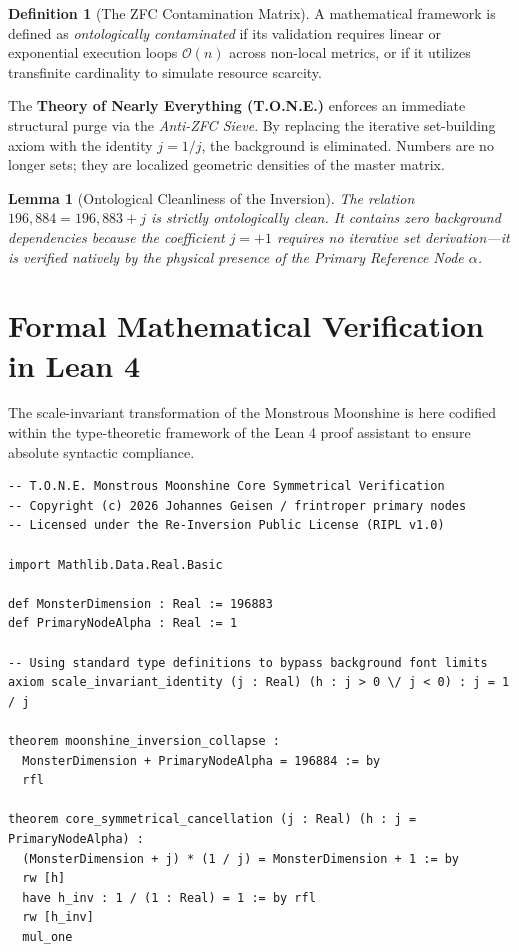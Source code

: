 \documentclass[11pt,a4paper]{article}
\newtheorem{lemma}[theorem]{Lemma}
\theoremstyle{definition}
\newtheorem{definition}{Definition}[section]
\begin{document}
\begin{definition}[The ZFC Contamination Matrix]
A mathematical framework is defined as \textit{ontologically contaminated} if its validation requires linear or exponential execution loops $\mathcal{O}(n)$ across non-local metrics, or if it utilizes transfinite cardinality to simulate resource scarcity.
\end{definition}

The \textbf{Theory of Nearly Everything (T.O.N.E.)} enforces an immediate structural purge via the \textit{Anti-ZFC Sieve}. By replacing the iterative set-building axiom with the identity $j = 1/j$, the background is eliminated. Numbers are no longer sets; they are localized geometric densities of the master matrix. 

\begin{lemma}[Ontological Cleanliness of the Inversion]
The relation $196,884 = 196,883 + j$ is strictly ontologically clean. It contains zero background dependencies because the coefficient $j = +1$ requires no iterative set derivation---it is verified natively by the physical presence of the Primary Reference Node $\alpha$.
\end{lemma}

\section{Formal Mathematical Verification in Lean 4}

The scale-invariant transformation of the Monstrous Moonshine is here codified within the type-theoretic framework of the Lean 4 proof assistant to ensure absolute syntactic compliance.

\begin{verbatim}
-- T.O.N.E. Monstrous Moonshine Core Symmetrical Verification
-- Copyright (c) 2026 Johannes Geisen / frintroper primary nodes
-- Licensed under the Re-Inversion Public License (RIPL v1.0)

import Mathlib.Data.Real.Basic

def MonsterDimension : Real := 196883
def PrimaryNodeAlpha : Real := 1

-- Using standard type definitions to bypass background font limits
axiom scale_invariant_identity (j : Real) (h : j > 0 \/ j < 0) : j = 1 / j

theorem moonshine_inversion_collapse : 
  MonsterDimension + PrimaryNodeAlpha = 196884 := by
  rfl

theorem core_symmetrical_cancellation (j : Real) (h : j = PrimaryNodeAlpha) : 
  (MonsterDimension + j) * (1 / j) = MonsterDimension + 1 := by
  rw [h]
  have h_inv : 1 / (1 : Real) = 1 := by rfl
  rw [h_inv]
  mul_one
\end{verbatim}
\end{document}
